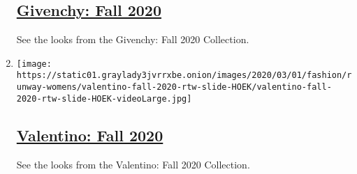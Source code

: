 \begin{enumerate}
  \hypertarget{givenchy-fall-2020}{%
  \subsection{\texorpdfstring{\href{/slideshow/2020/03/01/fashion/runway-womens/givenchy-fall-2020.html}{Givenchy:
  Fall 2020}}{Givenchy: Fall 2020}}\label{givenchy-fall-2020}}

  See the looks from the Givenchy: Fall 2020 Collection.
\item
  \texttt{[image: https://static01.graylady3jvrrxbe.onion/images/2020/03/01/fashion/runway-womens/valentino-fall-2020-rtw-slide-HOEK/valentino-fall-2020-rtw-slide-HOEK-videoLarge.jpg]}

  \hypertarget{valentino-fall-2020}{%
  \subsection{\texorpdfstring{\href{/slideshow/2020/03/01/fashion/runway-womens/valentino-fall-2020.html}{Valentino:
  Fall 2020}}{Valentino: Fall 2020}}\label{valentino-fall-2020}}

  See the looks from the Valentino: Fall 2020 Collection.
\end{enumerate}


